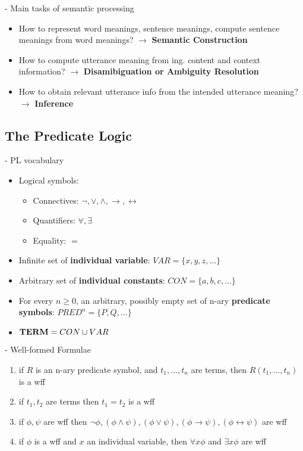 \documentclass[11pt]{article}
\begin{document}
- Main tasks of semantic processing
\begin{itemize}
 \item How to represent word meanings, sentence meanings, compute sentence meanings from word meanings? $\rightarrow$ {\bf Semantic Construction}
 \item How to compute utterance meaning from ing. content and context information? $\rightarrow$ {\bf Disamibiguation or Ambiguity Resolution}
 \item How to obtain relevant utterance info from the intended utterance meaning? $\rightarrow$ {\bf Inference}
\end{itemize}

\subsection{The Predicate Logic}
- PL vocabulary
\begin{itemize}
 \item Logical symbols:
\begin{itemize}
 \item Connectives: $\neg, \vee, \wedge, \rightarrow, \leftrightarrow$
 \item Quantifiers: $\forall, \exists$
 \item Equality: $=$
\end{itemize}
 \item Infinite set of {\bf individual variable}: $VAR = \{x, y, z, ...\}$
 \item Arbitrary set of {\bf individual constants}: $CON = \{a, b, c,...\}$
 \item For every $n \geq 0$, an arbitrary, possibly empty set of n-ary {\bf predicate symbols}: $PRED^n = \{P, Q, ...\}$ 
 \item ${\bf TERM} = CON \cup VAR$
\end{itemize}
- Well-formed Formulae
\begin{enumerate}
 \item if $R$ is an n-ary predicate symbol, and $t_1 , ..., t_n$ are terms, then $R(t_1 , ..., t_n )$ is a wff
 \item if $t_1 , t_2$ are terms then $t_1 = t_2$ is a wff
 \item if $\phi, \psi$ are wff then $\neg\phi, (\phi\wedge\psi), (\phi\vee\psi), (\phi\rightarrow\psi), (\phi\leftrightarrow\psi)$ are wff
 \item if $\phi$ is a wff and $x$ an individual variable, then $\forall x\phi$ and $\exists x\phi$ are wff
\end{enumerate}
\end{document}
